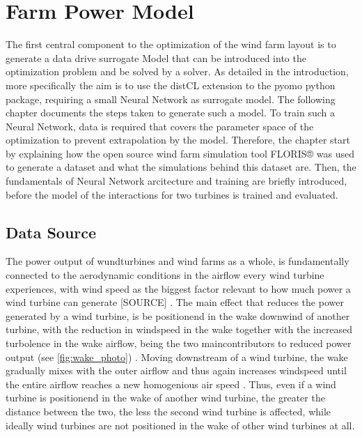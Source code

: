 \chapter{Farm Power Model}\label{chapter:power_model}

The first central component to the optimization of the wind farm layout is to generate a data drive surrogate Model that can be introduced into the optimization problem and be solved by a solver. As detailed in the introduction, more specifically the aim is to use the distCL extension to the pyomo python package, requiring a small Neural Network as surrogate model. The following chapter documents the steps taken to generate such a model. To train such a Neural Network, data is required that covers the parameter space of the optimization to prevent extrapolation by the model. Therefore, the chapter start by explaining how the open source wind farm simulation tool FLORIS® was used to generate a dataset and what the simulations behind this dataset are. Then, the fundamentals of Neural Network arcitecture and training are briefly introduced, before the model of the interactions for two turbines is trained and evaluated.



\section{Data Source}

The power output of wundturbines and wind farms as a whole, is fundamentally connected to the aerodynamic conditions in the airflow every wind turbine experiences, with wind speed as the biggest factor relevant to how much power a wind turbine can generate [SOURCE] . The main effect that reduces the power generated by a wind turbine, is be positionend in the wake downwind of another turbine, with the reduction in windspeed in the wake together with the increased turbolence in the wake airflow,  being the two maincontributors to reduced power output (see \ref{fig:wake_photo})  \cite{KIRANOUDIS1997439}. Moving downstream of a wind turbine, the wake gradually mixes with the outer airflow and thus again increases windspeed until the entire airflow reaches a new homogenious air speed \cite{MAGNUSSON1999169}. Thus, even if a wind turbine is positionend in the wake of another wind turbine, the greater the distance between the two, the less the second wind turbine is affected, while ideally wind turbines are not positioned in the wake of other wind turbines at all. 

